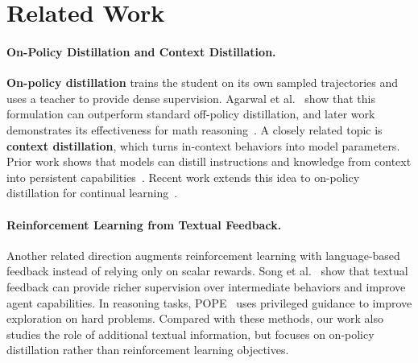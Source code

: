\section{Related Work}

\paragraph{On-Policy Distillation and Context Distillation.}
\textbf{On-policy distillation} trains the student on its own sampled trajectories and uses a teacher to provide dense supervision. Agarwal et al.~\cite{agarwal2024onpolicydistillationlanguagemodels} show that this formulation can outperform standard off-policy distillation, and later work demonstrates its effectiveness for math reasoning~\cite{lu2025onpolicydistillation}. A closely related topic is \textbf{context distillation}, which turns in-context behaviors into model parameters. Prior work shows that models can distill instructions and knowledge from context into persistent capabilities~\cite{snell2022learningdistillingcontext}. Recent work extends this idea to on-policy distillation for continual learning~\cite{shenfeld2026selfdistillationenablescontinuallearning, ye2026onpolicycontextdistillationlanguage}.


\paragraph{Reinforcement Learning from Textual Feedback.}
Another related direction augments reinforcement learning with language-based feedback instead of relying only on scalar rewards. Song et al.~\cite{song2026expandingcapabilitiesreinforcementlearning} show that textual feedback can provide richer supervision over intermediate behaviors and improve agent capabilities. In reasoning tasks, POPE~\cite{qu2026popelearningreasonhard} uses privileged guidance to improve exploration on hard problems. Compared with these methods, our work also studies the role of additional textual information, but focuses on on-policy distillation rather than reinforcement learning objectives.